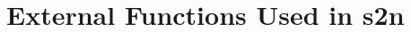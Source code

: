 \chapter{External Functions Used in s2n}
\label{app:externalFunctions}

\setlength{\columnsep}{6em}
\begin{multicols}{4}
\scriptsize{

}
\end{multicols}